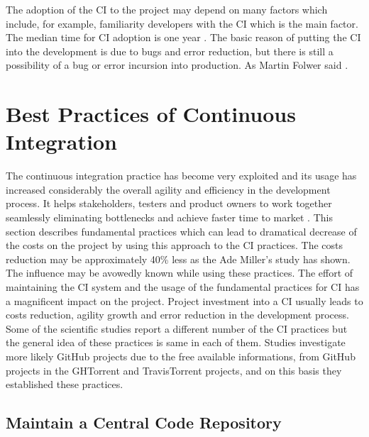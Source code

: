 The adoption of the CI to the project may depend on many factors which include, for example, familiarity developers with the CI which is the main factor. The median time for CI adoption is one year \cite{COPE}. The basic reason of putting the CI into the development is due to bugs and error reduction, but there is still a possibility of a bug or error incursion into production. As Martin Folwer said  \cite{MartinFowler}.

\section{Best Practices of Continuous Integration}

The continuous integration practice has become very exploited and its usage has increased considerably the overall agility and efficiency in the development process. It helps stakeholders, testers and product owners to work together seamlessly eliminating bottlenecks and achieve faster time to market \cite{CI-BP1}. This section describes fundamental practices which can lead to dramatical decrease of the costs on the project by using this approach to the CI practices. The costs reduction may be approximately 40\% less as the Ade Miller's study \cite{100DaysOfCI} has shown. The influence may be avowedly known while using these practices. The effort of maintaining the CI system and the usage of the fundamental practices for CI has a magnificent impact on the project. Project investment into a CI usually leads to costs reduction, agility growth and error reduction in the development process. Some of the scientific studies report a different number of the CI practices but the general idea of these practices is same in each of them. Studies investigate more likely GitHub projects due to the free available informations, from GitHub projects in the GHTorrent and TravisTorrent projects, and on this basis they established these practices.

\subsection{Maintain a Central Code Repository}

